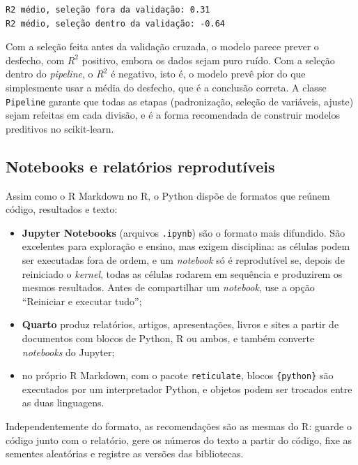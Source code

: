 \documentclass[
]{book}
\providecommand{\tightlist}{%
  \setlength{\itemsep}{0pt}\setlength{\parskip}{0pt}}
\begin{document}
\begin{verbatim}
R2 médio, seleção fora da validação: 0.31
R2 médio, seleção dentro da validação: -0.64
\end{verbatim}

Com a seleção feita antes da validação cruzada, o modelo parece prever o desfecho, com \(R^2\) positivo, embora os dados sejam puro ruído. Com a seleção dentro do \emph{pipeline}, o \(R^2\) é negativo, isto é, o modelo prevê pior do que simplesmente usar a média do desfecho, que é a conclusão correta. A classe \texttt{Pipeline} garante que todas as etapas (padronização, seleção de variáveis, ajuste) sejam refeitas em cada divisão, e é a forma recomendada de construir modelos preditivos no scikit-learn.

\subsection{Notebooks e relatórios reprodutíveis}\label{notebooks-e-relatuxf3rios-reprodutuxedveis}

Assim como o R Markdown no R, o Python dispõe de formatos que reúnem código, resultados e texto:

\begin{itemize}
\tightlist
\item
  \textbf{Jupyter Notebooks} (arquivos \texttt{.ipynb}) são o formato mais difundido. São excelentes para exploração e ensino, mas exigem disciplina: as células podem ser executadas fora de ordem, e um \emph{notebook} só é reprodutível se, depois de reiniciado o \emph{kernel}, todas as células rodarem em sequência e produzirem os mesmos resultados. Antes de compartilhar um \emph{notebook}, use a opção ``Reiniciar e executar tudo'';
\item
  \textbf{Quarto} produz relatórios, artigos, apresentações, livros e sites a partir de documentos com blocos de Python, R ou ambos, e também converte \emph{notebooks} do Jupyter;
\item
  no próprio R Markdown, com o pacote \texttt{reticulate}, blocos \texttt{\textasciigrave{}\textasciigrave{}\textasciigrave{}\{python\}} são executados por um interpretador Python, e objetos podem ser trocados entre as duas linguagens.
\end{itemize}

Independentemente do formato, as recomendações são as mesmas do R: guarde o código junto com o relatório, gere os números do texto a partir do código, fixe as sementes aleatórias e registre as versões das bibliotecas.
\end{document}
